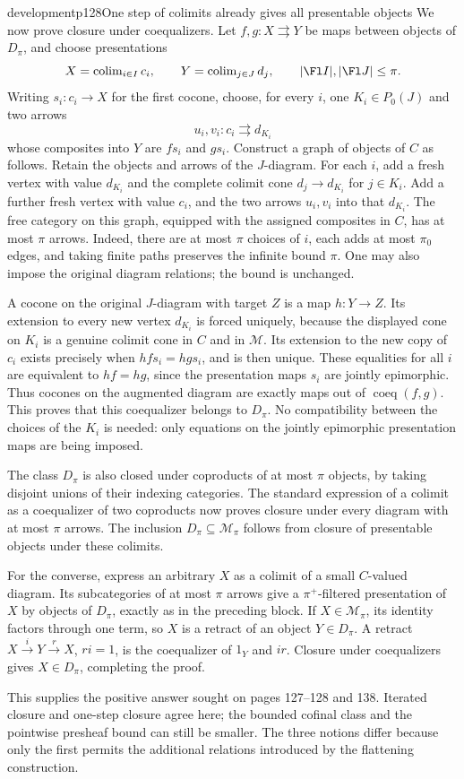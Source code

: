 \begin{dcomment}{development}{p128}{One step of colimits already gives all presentable objects}
We now prove closure under coequalizers. Let $f,g:X\rightrightarrows Y$ be maps between objects of $D_\pi$, and choose presentations
\[
 X=\operatorname{colim}_{i\in I}c_i,
 \qquad Y=\operatorname{colim}_{j\in J}d_j,
 \qquad |\Fl I|,|\Fl J|\leq\pi.
\]
Writing $s_i:c_i\to X$ for the first cocone, choose, for every $i$, one $K_i\in P_0(J)$ and two arrows
\[
 u_i,v_i:c_i\rightrightarrows d_{K_i}
\]
whose composites into $Y$ are $fs_i$ and $gs_i$. Construct a graph of objects of $C$ as follows. Retain the objects and arrows of the $J$-diagram. For each $i$, add a fresh vertex with value $d_{K_i}$ and the complete colimit cone $d_j\to d_{K_i}$ for $j\in K_i$. Add a further fresh vertex with value $c_i$, and the two arrows $u_i,v_i$ into that $d_{K_i}$. The free category on this graph, equipped with the assigned composites in $C$, has at most $\pi$ arrows. Indeed, there are at most $\pi$ choices of $i$, each adds at most $\pi_0$ edges, and taking finite paths preserves the infinite bound $\pi$. One may also impose the original diagram relations; the bound is unchanged.

A cocone on the original $J$-diagram with target $Z$ is a map $h:Y\to Z$. Its extension to every new vertex $d_{K_i}$ is forced uniquely, because the displayed cone on $K_i$ is a genuine colimit cone in $C$ and in $\mathcal M$. Its extension to the new copy of $c_i$ exists precisely when $hfs_i=hgs_i$, and is then unique. These equalities for all $i$ are equivalent to $hf=hg$, since the presentation maps $s_i$ are jointly epimorphic. Thus cocones on the augmented diagram are exactly maps out of $\operatorname{coeq}(f,g)$. This proves that this coequalizer belongs to $D_\pi$. No compatibility between the choices of the $K_i$ is needed: only equations on the jointly epimorphic presentation maps are being imposed.

The class $D_\pi$ is also closed under coproducts of at most $\pi$ objects, by taking disjoint unions of their indexing categories. The standard expression of a colimit as a coequalizer of two coproducts now proves closure under every diagram with at most $\pi$ arrows. The inclusion $D_\pi\subseteq\mathcal M_\pi$ follows from closure of presentable objects under these colimits.

For the converse, express an arbitrary $X$ as a colimit of a small $C$-valued diagram. Its subcategories of at most $\pi$ arrows give a $\pi^+$-filtered presentation of $X$ by objects of $D_\pi$, exactly as in the preceding block. If $X\in\mathcal M_\pi$, its identity factors through one term, so $X$ is a retract of an object $Y\in D_\pi$. A retract $X\xrightarrow{i}Y\xrightarrow{r}X$, $ri=1$, is the coequalizer of $1_Y$ and $ir$. Closure under coequalizers gives $X\in D_\pi$, completing the proof.

This supplies the positive answer sought on pages 127--128 and 138. Iterated closure and one-step closure agree here; the bounded cofinal class and the pointwise presheaf bound can still be smaller. The three notions differ because only the first permits the additional relations introduced by the flattening construction.
\end{dcomment}

